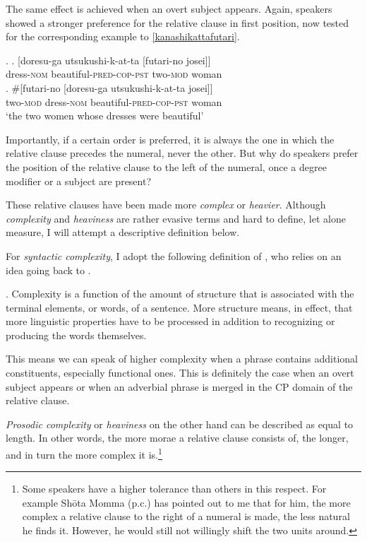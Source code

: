 The same effect is achieved when an overt subject appears. Again, speakers showed a stronger preference for the relative clause in first position, now tested for the corresponding example to \ref{kanashikattafutari}.

\ex. \label{dorama with subject} \ag. [doresu-ga utsukushi-k-at-ta [futari-no josei]]\\
dress-\textsc{nom} beautiful-\textsc{pred-cop-pst} two-\textsc{mod} woman\\
\bg. \#[futari-no [doresu-ga utsukushi-k-at-ta josei]]\\
two-\textsc{mod} dress-\textsc{nom} beautiful-\textsc{pred-cop-pst} woman\\
`the two women whose dresses were beautiful'

Importantly, if a certain order is preferred, it is always the one in which the relative clause precedes the numeral, never the other. But why do speakers prefer the position of the relative clause to the left of the numeral, once a degree modifier or a subject are present?

These relative clauses have been made more \textit{complex} or \textit{heavier}. Although \textit{complexity} and \textit{heaviness} are rather evasive terms and hard to define, let alone measure, I will attempt a descriptive definition below. 

For \textit{syntactic complexity}, I adopt the following definition of \citet{hawkins:2007:efficiency}, who relies on an idea going back to \citet{miller:1963:finitary}.

\ex. Complexity is a function of the amount of structure that is associated with the terminal elements, or words, of a sentence. More structure means, in effect, that more linguistic properties have to be processed in addition to recognizing or producing the words themselves. \\ \null \hfill \citep[8]{hawkins:2007:efficiency}

This means we can speak of higher complexity when a phrase contains additional constituents, especially functional ones. This is definitely the case when an overt subject appears or when an adverbial phrase is merged in the CP domain of the relative clause.

\textit{Prosodic complexity} or \textit{heaviness} on the other hand can be described as equal to length. In other words, the more morae a relative clause consists of, the longer, and in turn the more complex it is.\footnote{Some speakers have a higher tolerance than others in this respect. For example Shōta Momma (p.c.) has pointed out to me that for him, the more complex a relative clause to the right of a numeral is made, the less natural he finds it. However, he would still not willingly shift the two units around.}

